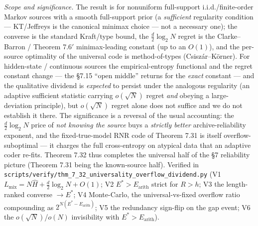 \documentclass[
]{article}
\begin{document}
\emph{Scope and significance.} The result is for nonuniform full-support
i.i.d./finite-order Markov sources with a smooth full-support prior (a
\emph{sufficient} regularity condition --- KT/Jeffreys is the canonical minimax
choice --- not a necessary one); the converse is the standard Kraft/type bound, the
$\tfrac d2\log_2 N$ regret is the Clarke--Barron / Theorem 7.6$'$ minimax-leading
constant (up to an $O(1)$), and the per-source optimality of the universal code is
method-of-types (Csisz\'ar--K\"orner). For hidden-state / continuous sources the
empirical-entropy functional and the regret constant change --- the §7.15 ``open
middle'' returns for the \emph{exact} constant --- and the qualitative dividend is
\emph{expected} to persist under the analogous regularity (an adaptive sufficient
statistic carrying $o(\sqrt N)$ regret \emph{and} obeying a large-deviation
principle), but $o(\sqrt N)$ regret alone does not suffice and we do not establish it
there. The significance is a reversal of the usual
accounting: the $\tfrac d2\log_2 N$ price of \emph{not knowing the source} buys a
\emph{strictly better} archive-reliability exponent, and the fixed-true-model RNR
code of Theorem 7.31 is itself overflow-suboptimal --- it charges the full
cross-entropy on atypical data that an adaptive coder re-fits. Theorem 7.32 thus
completes the universal half of the §7 reliability picture (Theorem 7.31 being the
known-source half). Verified in
\texttt{scripts/verify/thm\_7\_32\_universality\_overflow\_dividend.py} (V1
$L_{\mathrm{mix}}=N\widehat H+\tfrac d2\log_2 N+O(1)$; V2 $E^\ast>E_{\mathrm{arith}}$
strict for $R>h$; V3 the length-ranked converse $\to E^\ast$; V4 Monte-Carlo, the
universal-vs-fixed overflow ratio compounding as $2^{N(E^\ast-E_{\mathrm{arith}})}$;
V5 the redundancy sign-flip on the gap event; V6 the $o(\sqrt N)$/$o(N)$ invisibility
with $E^\ast>E_{\mathrm{arith}}$).
\end{document}
